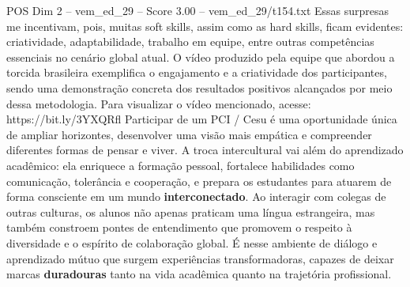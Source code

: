 \begin{textsample}{POS Dim 2 – vem\_ed\_29 – Score 3.00 – vem\_ed\_29/t154.txt}
Essas surpresas me incentivam, pois, muitas soft skills, assim como as hard skills, ficam evidentes: criatividade, adaptabilidade, trabalho em equipe, entre outras competências essenciais no cenário global atual.
O vídeo produzido pela equipe que abordou a torcida brasileira exemplifica o engajamento e a criatividade dos participantes, sendo uma demonstração concreta dos resultados positivos alcançados por meio dessa metodologia.
Para visualizar o vídeo mencionado, acesse: https://bit.ly/3YXQRfl Participar de um PCI / Cesu é uma oportunidade única de ampliar horizontes, desenvolver uma visão mais empática e compreender diferentes formas de pensar e viver.
A troca intercultural vai além do aprendizado acadêmico: ela enriquece a formação pessoal, fortalece habilidades como comunicação, tolerância e cooperação, e prepara os estudantes para atuarem de forma consciente em um mundo \textbf{interconectado}.
Ao interagir com colegas de outras culturas, os alunos não apenas praticam uma língua estrangeira, mas também constroem pontes de entendimento que promovem o respeito à diversidade e o espírito de colaboração global.
É nesse ambiente de diálogo e aprendizado mútuo que surgem experiências transformadoras, capazes de deixar marcas \textbf{duradouras} tanto na vida acadêmica quanto na trajetória profissional.

\end{textsample}
